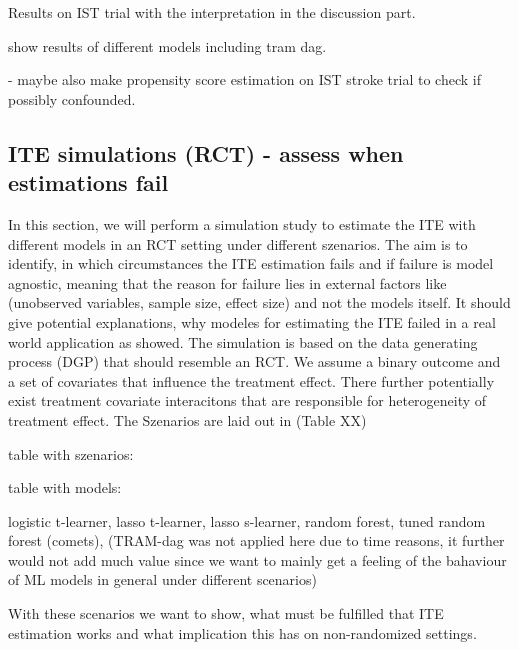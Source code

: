 Results on IST trial with the interpretation in the discussion part.


show results of different models including tram dag.

- maybe also make propensity score estimation on IST stroke trial to check if possibly confounded.




\subsection{ITE simulations (RCT) - assess when estimations fail}

In this section, we will perform a simulation study to estimate the ITE with different models in an RCT setting under different szenarios. The aim is to identify, in which circumstances the ITE estimation fails and if failure is model agnostic, meaning that the reason for failure lies in external factors like (unobserved variables, sample size, effect size) and not the models itself. It should give potential explanations, why modeles for estimating the ITE failed in a real world application as \citet{chen2025} showed. The simulation is based on the data generating process (DGP) that should resemble an RCT. We assume a binary outcome and a set of covariates that influence the treatment effect. There further potentially exist treatment covariate interacitons that are responsible for heterogeneity of treatment effect. The Szenarios are laid out in (Table XX)

table with szenarios:



table with models:

logistic t-learner, lasso t-learner, lasso s-learner, random forest, tuned random forest (comets), (TRAM-dag was not applied here due to time reasons, it further would not add much value since we want to mainly get a feeling of the bahaviour of ML models in general under different scenarios)


With these scenarios we want to show, what must be fulfilled that ITE estimation works and what implication this has on non-randomized settings.




